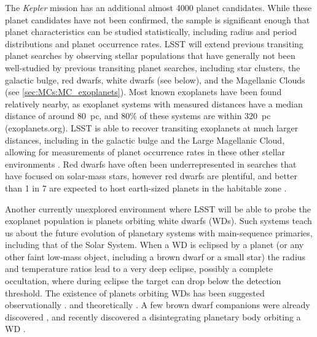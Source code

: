 The {\it Kepler} mission has an additional almost 4000 planet
candidates. While these planet candidates have not been confirmed, the
sample is significant enough that planet characteristics can be studied
statistically, including radius and period distributions and planet
occurrence rates. LSST will extend previous transiting planet searches
by observing stellar populations that have generally not been
well-studied by previous transiting planet searches, including star
clusters, the galactic bulge, red dwarfs, white dwarfs (see below), and
the Magellanic Clouds (see \autoref{sec:MCs:MC_exoplanets}). Most known
exoplanets have been found relatively nearby, as exoplanet systems with
measured distances have a median distance of around 80~pc, and 80\% of these
systems are within 320~pc (exoplanets.org). LSST is able to recover transiting
exoplanets at much larger distances, including in the galactic bulge and the
Large Magellanic Cloud, allowing for measurements of planet occurrence rates in
these other stellar environments
\citep{2015AJ....149...16L,2015AJ....150...34J}.
Red dwarfs have often been
underrepresented in searches that have focused on solar-mass stars, however red
dwarfs are plentiful, and better than 1 in 7 are expected to host earth-sized
planets in the habitable zone \citep{2015ApJ...807...45D}.

Another currently unexplored environment where LSST will be able to
probe the exoplanet population is planets orbiting white dwarfs (WDs).
Such systems teach us about the future evolution of planetary systems
with main-sequence primaries, including that of the Solar System. When a
WD is eclipsed by a planet (or any other faint low-mass object,
including a brown dwarf or a small star) the radius and temperature
ratios lead to a very deep eclipse, possibly a complete occultation,
where during eclipse the target can drop below the detection threshold.
The existence of planets orbiting WDs has been suggested
observationally
\citep[e.g.,][]{2009ApJ...694..805F,2009AJ....137.3191J,2010ApJ...722..725Z,2012ApJ...747..148D}.
and theoretically \citep[e.g.,][]{2010MNRAS.408..631N}.
A few brown dwarf companions were already discovered
\citep[e.g.,][]{2006Natur.442..543M,2012ApJ...759L..34C,2006Sci...314.1578L,2014MNRAS.445.2106L},
and \citet{2015Natur.526..546V}
recently discovered a disintegrating planetary body orbiting a WD
\citep[see also][]{2015arXiv151006434C,2016ApJ...818L...7G,2016MNRAS.458.3904R}.

